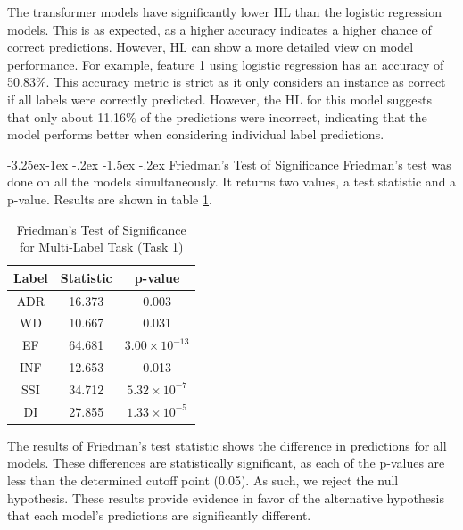 \documentclass[10.7pt, onecolumn]{article}
\makeatletter
\renewcommand\subsubsection{\@startsection{subsubsection}{3}{\z@}%
	{-3.25ex\@plus -1ex \@minus -.2ex}%
    {-1.5ex \@plus -.2ex}%
    {\normalfont\itshape}}
\makeatother
\begin{document}
The transformer models have significantly lower HL than the logistic regression models. This is as expected, as a higher accuracy indicates a higher chance of correct predictions. However, HL can show a more detailed view on model performance. For example, feature 1 using logistic regression has an accuracy of 50.83\%. This accuracy metric is strict as it only considers an instance as correct if all labels were correctly predicted. However, the HL for this model suggests that only about 11.16\% of the predictions were incorrect, indicating that the model performs better when considering individual label predictions.

\subsubsection{Friedman's Test of Significance}
Friedman's test was done on all the models simultaneously. It returns two values, a test statistic and a p-value. Results are shown in table \ref{tab:friedmansTest}.

\begin{table}[H]
  \centering
  \small
  \begin{tabular}{|c|c|c|}
  \hline
  \textbf{Label} & \textbf{Statistic} & \textbf{p-value} \\ 
  \hline
  ADR & 16.373 & 0.003 \\ 
  \hline
  WD & 10.667 & 0.031 \\ 
  \hline
  EF & 64.681 & $3.00 \times 10^{-13}$ \\ 
  \hline
  INF & 12.653 & 0.013 \\ \hline
  SSI & 34.712 & $5.32 \times 10^{-7}$ \\ 
  \hline
  DI & 27.855 & $1.33 \times 10^{-5}$ \\ 
  \hline
  \end{tabular}
  \caption{Friedman's Test of Significance for Multi-Label Task (Task 1)}
  \label{tab:friedmansTest}
\end{table}

The results of Friedman's test statistic shows the difference in predictions for all models. These differences are statistically significant, as each of the p-values are less than the determined cutoff point (0.05). As such, we reject the null hypothesis. These results provide evidence in favor of the alternative hypothesis that each model's predictions are significantly different.
\end{document}
